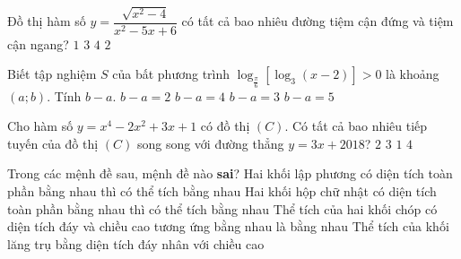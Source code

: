 \begin{ex}%
Đồ thị hàm số $y=\dfrac{\sqrt{x^2-4}}{x^2-5x+6}$ có tất cả bao nhiêu đường tiệm cận đứng và tiệm cận ngang?
\choice
{$1$}
{\True $3$}
{$4$}
{$2$}
\end{ex}

\begin{ex}%
Biết tập nghiệm $S$ của bất phương trình $\log_{\tfrac{\pi}{6}}\left[ \log_3(x-2) \right]>0$ là khoảng $(a;b)$. Tính $b-a$.
\choice
{\True $b-a=2$}
{$b-a=4$}
{$b-a=3$}
{$b-a=5$}
\end{ex}

\begin{ex}%
Cho hàm số $y=x^4-2x^2+3x+1$ có đồ thị $(C)$. Có tất cả bao nhiêu tiếp tuyến của đồ thị $(C)$ song song với đường thẳng $y=3x+2018$?
\choice
{$2$}
{\True $3$}
{$1$}
{$4$}
\end{ex}

\begin{ex}%
Trong các mệnh đề sau, mệnh đề nào \textbf{sai}?
\choice
{Hai khối lập phương có diện tích toàn phần bằng nhau thì có thể tích bằng nhau}
{\True Hai khối hộp chữ nhật có diện tích toàn phần bằng nhau thì có thể tích bằng nhau}
{Thể tích của hai khối chóp có diện tích đáy và chiều cao tương ứng bằng nhau là bằng nhau}
{Thể tích của khối lăng trụ bằng diện tích đáy nhân với chiều cao}
\end{ex}

